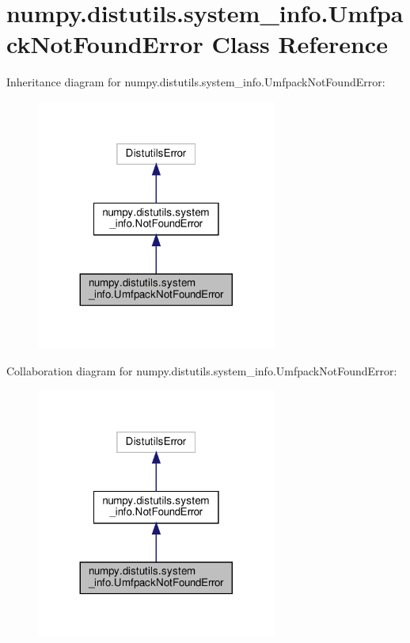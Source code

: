 \hypertarget{classnumpy_1_1distutils_1_1system__info_1_1UmfpackNotFoundError}{}\section{numpy.\+distutils.\+system\+\_\+info.\+Umfpack\+Not\+Found\+Error Class Reference}
\label{classnumpy_1_1distutils_1_1system__info_1_1UmfpackNotFoundError}


Inheritance diagram for numpy.\+distutils.\+system\+\_\+info.\+Umfpack\+Not\+Found\+Error\+:
\nopagebreak
\begin{figure}[H]
\begin{center}
\leavevmode
\includegraphics[width=224pt]{classnumpy_1_1distutils_1_1system__info_1_1UmfpackNotFoundError__inherit__graph}
\end{center}
\end{figure}


Collaboration diagram for numpy.\+distutils.\+system\+\_\+info.\+Umfpack\+Not\+Found\+Error\+:
\nopagebreak
\begin{figure}[H]
\begin{center}
\leavevmode
\includegraphics[width=224pt]{classnumpy_1_1distutils_1_1system__info_1_1UmfpackNotFoundError__coll__graph}
\end{center}
\end{figure}



